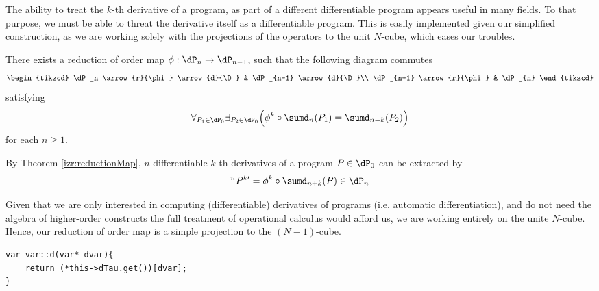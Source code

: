 \label{sec:orderReduction}
 
The ability to treat the $k$-th derivative of a program, as part of a different differentiable program appears useful in many fields. To that purpose, we must be able to threat the derivative itself as a differentiable program. This is easily implemented given our simplified construction, as we are working solely with the projections of the operators to the unit $N$-cube, which eases our troubles.

\begin{izrek}\label{izr:reductionMap}
There exists a reduction of order map $\phi:\dP_n\to \dP_{n-1}$, such that the
following  diagram commutes
\begin{equation}\label{eq:reductionMap}
\begin{tikzcd}
  \dP_n \arrow{r}{\phi} \arrow{d}{\D} & 
  \dP_{n-1} \arrow{d}{\D}\\
  \dP_{n+1} \arrow{r}{\phi} & 
  \dP_{n}
\end{tikzcd}
\end{equation}
satisfying
\begin{equation}
\forall_{P_1\in\dP_0}\exists_{P_2\in\dP_0}\Big(\phi^k\circ \sumd_n(P_1)=\sumd_{n-k}(P_2)\Big)
\end{equation}
for each $n\ge 1$.
\end{izrek}  
\begin{corollary}\label{cor:extraxtDerivatives}
By Theorem \ref{izr:reductionMap}, $n$-differentiable $k$-th derivatives of a program $P\in\dP_0$ can be extracted by
\begin{equation}
^{n}P^{k\prime}=\phi^k\circ \sumd_{n+k}(P)\in\dP_n
\end{equation}
\end{corollary}

Given that we are only interested in computing (differentiable) derivatives of programs (i.e. automatic differentiation), and do not need the algebra of higher-order constructs the full treatment of operational calculus would afford us, we are working entirely on the unite $N$-cube. Hence, our reduction of order map is a simple projection to the $(N-1)$-cube.

\begin{lstlisting}
var var::d(var* dvar){
    return (*this->dTau.get())[dvar];
}
\end{lstlisting}
